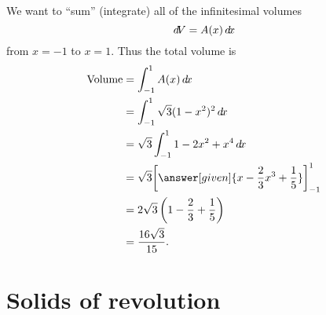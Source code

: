 \documentclass{ximera}
\begin{document}
\begin{example}
\begin{explanation}
We want to ``sum'' (integrate) all of the infinitesimal volumes
\[
\mathop{}\!d\! V = A(x) \mathop{}\!d\! x
\]
from $x=-1$ to $x=1$.  Thus the total volume is
\begin{align*}
  \text{Volume} &= \int_{-1}^1 A(x) \d x  \\
  &= \int_{-1}^1 \sqrt{3} (1-x^2)^2 \d x\\
  &=\sqrt{3} \int_{-1}^1 1-2x^2+x^4 \d x \\
  &=\sqrt{3} \eval{\answer[given]{x-\frac{2}{3}x^3+\frac{1}{5}}}_{-1}^1\\
  &=2\sqrt{3}\left(1-\frac{2}{3}+\frac{1}{5}\right)\\
  &=\frac{16\sqrt{3}}{15}.
\end{align*}
\end{explanation}
\end{example}



\section{Solids of revolution}
\end{document}
